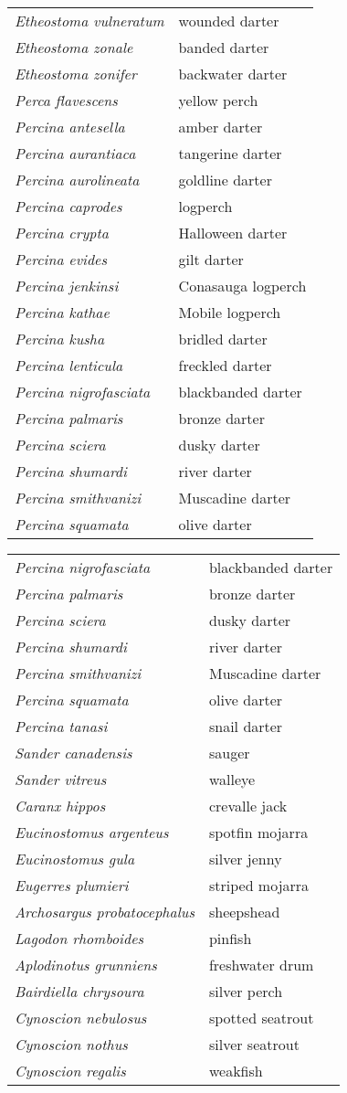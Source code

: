 \documentclass[11pt]{article}
\begin{document}
\begin{tabular}{@{}L{3in}L{3in}@{}}
\textit{Etheostoma vulneratum} &   wounded darter\tabularnewline
\textit{Etheostoma zonale} &   banded darter\tabularnewline
\textit{Etheostoma zonifer} &   backwater darter\tabularnewline
\textit{Perca flavescens} &   yellow perch\tabularnewline
\textit{Percina antesella} &   amber darter\tabularnewline
\textit{Percina aurantiaca} &   tangerine darter\tabularnewline
\textit{Percina aurolineata} &   goldline darter\tabularnewline
\textit{Percina caprodes} &   logperch\tabularnewline
\textit{Percina crypta} &   Halloween darter\tabularnewline
\textit{Percina evides} &   gilt darter\tabularnewline
\textit{Percina jenkinsi} &   Conasauga logperch\tabularnewline
\textit{Percina kathae} &   Mobile logperch\tabularnewline
\textit{Percina kusha} &   bridled darter\tabularnewline
\textit{Percina lenticula} &   freckled darter\tabularnewline
\textit{Percina nigrofasciata} &   blackbanded darter\tabularnewline
\textit{Percina palmaris} &   bronze darter\tabularnewline
\textit{Percina sciera} &   dusky darter\tabularnewline
\textit{Percina shumardi} &   river darter\tabularnewline
\textit{Percina smithvanizi} &   Muscadine darter\tabularnewline
\textit{Percina squamata} &   olive darter\tabularnewline
\end{tabular}

\vspace{\baselineskip}

%
\textbf{\Student}

\begin{tabular}{@{}L{3in}L{3in}@{}}
\textit{Percina nigrofasciata} &   blackbanded darter\tabularnewline
\textit{Percina palmaris} &   bronze darter\tabularnewline
\textit{Percina sciera} &   dusky darter\tabularnewline
\textit{Percina shumardi} &   river darter\tabularnewline
\textit{Percina smithvanizi} &   Muscadine darter\tabularnewline
\textit{Percina squamata} &   olive darter\tabularnewline
\textit{Percina tanasi} &   snail darter\tabularnewline
\textit{Sander canadensis} &   sauger\tabularnewline
\textit{Sander vitreus} &   walleye\tabularnewline
\textit{Caranx hippos} &   crevalle jack\tabularnewline
\textit{Eucinostomus argenteus} &   spotfin mojarra\tabularnewline
\textit{Eucinostomus gula} &   silver jenny\tabularnewline
\textit{Eugerres plumieri} &   striped mojarra\tabularnewline
\textit{Archosargus probatocephalus} &   sheepshead\tabularnewline
\textit{Lagodon rhomboides} &   pinfish\tabularnewline
\textit{Aplodinotus grunniens} &   freshwater drum\tabularnewline
\textit{Bairdiella chrysoura} &   silver perch\tabularnewline
\textit{Cynoscion nebulosus} &   spotted seatrout\tabularnewline
\textit{Cynoscion nothus} &   silver seatrout\tabularnewline
\textit{Cynoscion regalis} &   weakfish\tabularnewline
\end{tabular}
\end{document}
